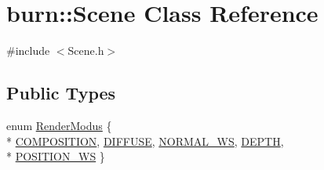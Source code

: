 \hypertarget{classburn_1_1_scene}{\section{burn\-:\-:Scene Class Reference}
\label{classburn_1_1_scene}
}


{\ttfamily \#include $<$Scene.\-h$>$}

\subsection*{Public Types}
\begin{DoxyCompactItemize}
\item 
enum \hyperlink{classburn_1_1_scene_a992349a23199d694dca7b8cbd4957299}{Render\-Modus} \{ \\*
\hyperlink{classburn_1_1_scene_a992349a23199d694dca7b8cbd4957299a9de887ba3d66505de29d661ec0cb0c63}{C\-O\-M\-P\-O\-S\-I\-T\-I\-O\-N}, 
\hyperlink{classburn_1_1_scene_a992349a23199d694dca7b8cbd4957299ac85a19cebcbd9de06a84f792bec68230}{D\-I\-F\-F\-U\-S\-E}, 
\hyperlink{classburn_1_1_scene_a992349a23199d694dca7b8cbd4957299ab2f9ede76e57d852bf0e82b5e3f1bb76}{N\-O\-R\-M\-A\-L\-\_\-\-W\-S}, 
\hyperlink{classburn_1_1_scene_a992349a23199d694dca7b8cbd4957299a8795288c1c09c990d1e3230b2b16261b}{D\-E\-P\-T\-H}, 
\\*
\hyperlink{classburn_1_1_scene_a992349a23199d694dca7b8cbd4957299abf537b9d28f1932ce09a6879e834ec8d}{P\-O\-S\-I\-T\-I\-O\-N\-\_\-\-W\-S}
 \}
\end{DoxyCompactItemize}
